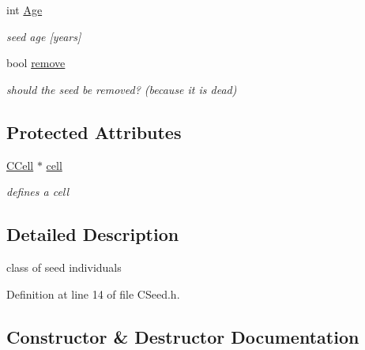 \begin{DoxyCompactItemize}
\mbox{\label{class_c_seed_acd19aea25a481eda44351b6a2ea868c3}} 
int \mbox{\hyperlink{class_c_seed_acd19aea25a481eda44351b6a2ea868c3}{Age}}
\begin{DoxyCompactList}\small\item\em seed age \mbox{[}years\mbox{]} \end{DoxyCompactList}\item 
\mbox{\label{class_c_seed_a5b8ca1bf3f81e494460c72474054a667}} 
bool \mbox{\hyperlink{class_c_seed_a5b8ca1bf3f81e494460c72474054a667}{remove}}
\begin{DoxyCompactList}\small\item\em should the seed be removed? (because it is dead) \end{DoxyCompactList}\end{DoxyCompactItemize}
\subsection*{Protected Attributes}
\begin{DoxyCompactItemize}
\item 
\mbox{\label{class_c_seed_a93f258be6fe7841d52daa4e9e362c00e}} 
\mbox{\hyperlink{class_c_cell}{C\+Cell}} $\ast$ \mbox{\hyperlink{class_c_seed_a93f258be6fe7841d52daa4e9e362c00e}{cell}}
\begin{DoxyCompactList}\small\item\em defines a cell \end{DoxyCompactList}\end{DoxyCompactItemize}


\subsection{Detailed Description}
class of seed individuals 

Definition at line 14 of file C\+Seed.\+h.



\subsection{Constructor \& Destructor Documentation}
\mbox{\label{class_c_seed_a9d8bb7aa1750b4e2fe36fced4178ced1}} 
